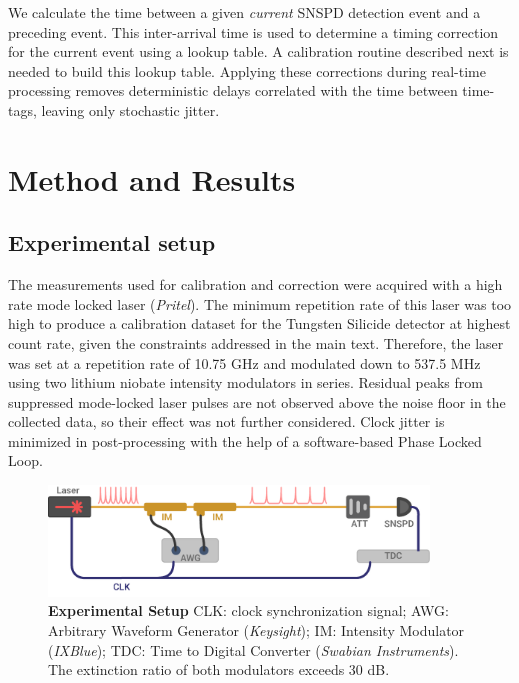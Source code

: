 \documentclass[11pt]{caltech_thesis} %
\begin{document}
We calculate the time between a given \emph{current} SNSPD detection event and a preceding event. This inter-arrival time is used to determine a timing correction for the current event using a lookup table. A calibration routine described next is needed to build this lookup table. Applying these corrections during real-time processing removes deterministic delays correlated with the time between time-tags, leaving only stochastic jitter.

\hypertarget{method-and-results}{%
\section{Method and Results}\label{method-and-results}}

\hypertarget{experimental-setup}{%
\subsection{Experimental setup}\label{experimental-setup}}

The measurements used for calibration and correction were acquired with a high rate mode locked laser (\emph{Pritel}). The minimum repetition rate of this laser was too high to produce a calibration dataset for the Tungsten Silicide detector at highest count rate, given the constraints addressed in the main text. Therefore, the laser was set at a repetition rate of 10.75 GHz and modulated down to 537.5 MHz using two lithium niobate intensity modulators in series. Residual peaks from suppressed mode-locked laser pulses are not observed above the noise floor in the collected data, so their effect was not further considered. Clock jitter is minimized in post-processing with the help of a software-based Phase Locked Loop.

\hypertarget{fig:jitterate_exp_setup}{%
\begin{figure}
\centering
\includegraphics[width=0.9\textwidth,height=\textheight]{./chapter_03/figs/supplemental_expirement_light.pdf}
\caption[{Time walk experiment setup}]{\textbf{Experimental Setup} CLK: clock synchronization signal; AWG: Arbitrary Waveform Generator (\emph{Keysight}); IM: Intensity Modulator (\emph{IXBlue}); TDC: Time to Digital Converter (\emph{Swabian Instruments}). The extinction ratio of both modulators exceeds 30 dB.}
\label{fig:jitterate_exp_setup}
\end{figure}
}
\end{document}
